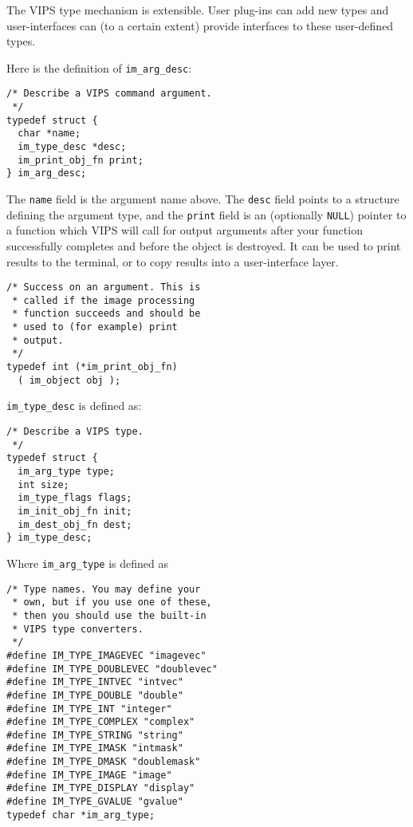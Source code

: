 The VIPS type mechanism is extensible. User plug-ins can add new types
and user-interfaces can (to a certain extent) provide interfaces to these
user-defined types.

Here is the definition of \verb+im_arg_desc+:

\begin{verbatim}
/* Describe a VIPS command argument.
 */
typedef struct {
  char *name;         
  im_type_desc *desc; 
  im_print_obj_fn print;
} im_arg_desc;
\end{verbatim}

The \verb+name+ field is the argument name above. The \verb+desc+ field
points to a structure defining the argument type, and the \verb+print+ field
is an (optionally \verb+NULL+) pointer to a function which VIPS will call
for output arguments after your function successfully completes and before
the object is destroyed. It can be used to print results to the terminal,
or to copy results into a user-interface layer.

\begin{verbatim}
/* Success on an argument. This is 
 * called if the image processing 
 * function succeeds and should be 
 * used to (for example) print 
 * output.
 */
typedef int (*im_print_obj_fn)
  ( im_object obj );
\end{verbatim}

\verb+im_type_desc+ is defined as:

\begin{verbatim}
/* Describe a VIPS type.
 */
typedef struct {
  im_arg_type type;    
  int size;         
  im_type_flags flags;
  im_init_obj_fn init;
  im_dest_obj_fn dest;
} im_type_desc;
\end{verbatim}

Where \verb+im_arg_type+ is defined as

\begin{verbatim}
/* Type names. You may define your 
 * own, but if you use one of these, 
 * then you should use the built-in 
 * VIPS type converters.
 */
#define IM_TYPE_IMAGEVEC "imagevec"
#define IM_TYPE_DOUBLEVEC "doublevec"
#define IM_TYPE_INTVEC "intvec"	
#define IM_TYPE_DOUBLE "double"
#define IM_TYPE_INT "integer"
#define IM_TYPE_COMPLEX "complex"
#define IM_TYPE_STRING "string" 
#define IM_TYPE_IMASK "intmask"
#define IM_TYPE_DMASK "doublemask"
#define IM_TYPE_IMAGE "image"    
#define IM_TYPE_DISPLAY "display"
#define IM_TYPE_GVALUE "gvalue"	
typedef char *im_arg_type;     
\end{verbatim}

